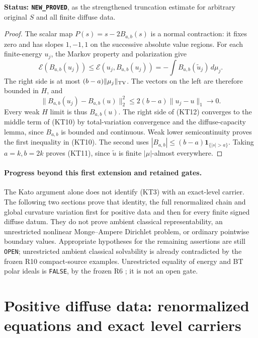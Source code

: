\documentclass[11pt,a4paper]{article}
\numberwithin{equation}{section}
\theoremstyle{definition}
\theoremstyle{remark}
\begin{document}
\noindent\textbf{Status: \texttt{NEW\_PROVED}}, as the strengthened
truncation estimate for arbitrary original $S$ and all finite diffuse
data.

\begin{proof}
The scalar map $P(s)=s-2B_{a,b}(s)$ is a normal contraction:
it fixes zero and has slopes $1,-1,1$ on the successive absolute
value regions.  For each finite-energy $u_j$, the Markov property
and polarization give
\[
 \mathcal E(B_{a,b}(u_j))
      \le\mathcal E(u_j,B_{a,b}(u_j))
      =-\int B_{a,b}(\widetilde u_j)\,d\mu_j.
 \tag{KT12}
\]
The right side is at most $(b-a)\|\mu_j\|_{\rm TV}$.
The vectors on the left are therefore bounded in $H$, and
\[
 \|B_{a,b}(u_j)-B_{a,b}(u)\|_2^2
                         \le2(b-a)\|u_j-u\|_1\longrightarrow0.
\]
Every weak $H$ limit is thus $B_{a,b}(u)$.
The right side of (KT12) converges to the middle term of (KT10)
by total-variation convergence and the diffuse-capacity lemma,
since $B_{a,b}$ is bounded and continuous.
Weak lower semicontinuity proves the first inequality in (KT10).
The second uses $|B_{a,b}|\le(b-a)\mathbf1_{\{|s|>a\}}$.
Taking $a=k,b=2k$ proves (KT11), since $\widetilde u$ is finite
$|\mu|$-almost everywhere.
\end{proof}

\paragraph{Progress beyond this first extension and retained gates.}
The Kato argument alone does not identify (KT3) with an exact-level
carrier.  The following two sections prove that identity, the full
renormalized chain and global curvature variation first for positive
data and then for every finite signed diffuse datum.  They do not prove
ambient classical representability, an unrestricted nonlinear
Monge--Ampere Dirichlet problem, or ordinary pointwise boundary
values.  Appropriate hypotheses for the remaining assertions are
still \texttt{OPEN}; unrestricted ambient classical solvability is
already contradicted by the frozen R10 compact-source examples.
Unrestricted equality of energy and BT polar ideals is
\texttt{FALSE}, by the frozen R6
; it is not an open gate.



\section{Positive diffuse data: renormalized equations and exact level carriers}
\label{sec:r11-positive-diffuse-renormalized}
\end{document}
